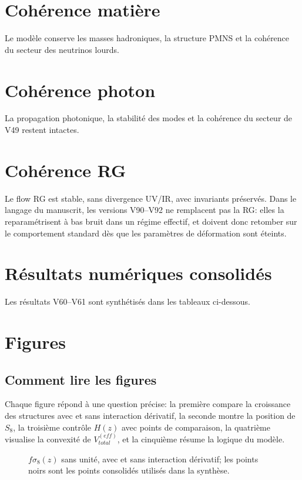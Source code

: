 \documentclass[11pt,a4paper]{article}
\begin{document}
\section{Cohérence matière}
Le modèle conserve les masses hadroniques, la structure PMNS et la cohérence du secteur des neutrinos lourds.

\section{Cohérence photon}
La propagation photonique, la stabilité des modes et la cohérence du secteur de V49 restent intactes.

\section{Cohérence RG}
Le flow RG est stable, sans divergence UV/IR, avec invariants préservés. Dans le langage du manuscrit, les versions V90--V92 ne remplacent pas la RG: elles la reparamétrisent à bas bruit dans un régime effectif, et doivent donc retomber sur le comportement standard dès que les paramètres de déformation sont éteints.

\section{Résultats numériques consolidés}
Les résultats V60--V61 sont synthétisés dans les tableaux ci-dessous.






\section{Figures}
\subsection{Comment lire les figures}
Chaque figure répond à une question précise: la première compare la croissance des structures avec et sans interaction dérivatif, la seconde montre la position de $S_8$, la troisième contrôle $H(z)$ avec points de comparaison, la quatrième visualise la convexité de $V_{total}^{(eff)}$, et la cinquième résume la logique du modèle.

\begin{figure}[htbp]
\centering

\caption{$f\sigma_8(z)$ sans unité, avec et sans interaction dérivatif; les points noirs sont les points consolidés utilisés dans la synthèse.}
\end{figure}
\end{document}
